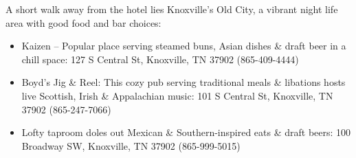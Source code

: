 \documentclass[12pt,letterpaper]{book}
\begin{document}
A short walk away from the hotel lies Knoxville's Old City, a vibrant night life area with good food and bar choices:

\begin{itemize}
\item Kaizen -- Popular place serving steamed buns, Asian dishes \& draft beer in a chill space: 127 S Central St, Knoxville, TN 37902 (865-409-4444)
\item Boyd's Jig \& Reel: This cozy pub serving traditional meals \& libations hosts live Scottish, Irish \& Appalachian music: 101 S Central St, Knoxville, TN 37902 (865-247-7066)
\item Lofty taproom doles out Mexican \& Southern-inspired eats \& draft beers: 100 Broadway SW, Knoxville, TN 37902 (865-999-5015)
\end{itemize}


\backmatter
\renewcommand{\indexname}{Author Index}
\printindex
\vspace{2cm}
\doclicenseThis 
\end{document}
